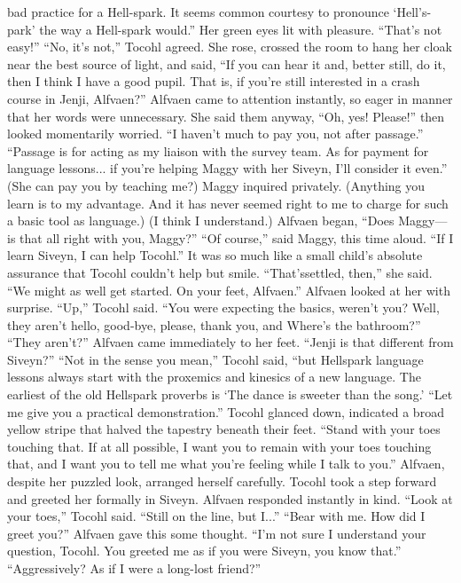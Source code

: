 \documentclass[9pt]{article}
\begin{document}
bad practice for a Hell-spark. It seems common courtesy to pronounce ‘Hell’s-park’ the way a
Hell-spark would.” Her green eyes lit with pleasure. “That’s not easy!”
“No, it’s not,” Tocohl agreed. She rose, crossed the room to hang her cloak near the best source of
light, and said, “If you can hear it and, better still, do it, then I think I have a good pupil. That is, if you’re
still interested in a crash course in Jenji, Alfvaen?”
Alfvaen came to attention instantly, so eager in manner that her words were unnecessary. She said
them anyway, “Oh, yes! Please!” then looked momentarily worried. “I haven’t much to pay you, not after
passage.”
“Passage is for acting as my liaison with the survey team. As for payment for language lessons... if
you’re helping Maggy with her Siveyn, I’ll consider it even.”
(She can pay you by teaching me?) Maggy inquired privately.
(Anything you learn is to my advantage. And it has never seemed right to me to charge for such a
basic tool as language.)
(I think I understand.)
Alfvaen began, “Does Maggy—is that all right with you, Maggy?”
“Of course,” said Maggy, this time aloud. “If I learn Siveyn, I can help Tocohl.”
It was so much like a small child’s absolute assurance that Tocohl couldn’t help but smile. “That’ssettled, then,” she said. “We might as well get started. On your feet, Alfvaen.”
Alfvaen looked at her with surprise.
“Up,” Tocohl said. “You were expecting the basics, weren’t you? Well, they aren’t hello, good-bye,
please, thank you, and Where’s the bathroom?”
“They aren’t?” Alfvaen came immediately to her feet. “Jenji is that different from Siveyn?”
“Not in the sense you mean,” Tocohl said, “but Hellspark language lessons always start with the
proxemics and kinesics of a new language. The earliest of the old Hellspark proverbs is ‘The dance is
sweeter than the song.’
“Let me give you a practical demonstration.” Tocohl glanced down, indicated a broad yellow stripe
that halved the tapestry beneath their feet. “Stand with your toes touching that. If at all possible, I want
you to remain with your toes touching that, and I want you to tell me what you’re feeling while I talk to
you.”
Alfvaen, despite her puzzled look, arranged herself carefully. Tocohl took a step forward and greeted
her formally in Siveyn. Alfvaen responded instantly in kind.
“Look at your toes,” Tocohl said.
“Still on the line, but I...”
“Bear with me. How did I greet you?”
Alfvaen gave this some thought. “I’m not sure I understand your question, Tocohl. You greeted me
as if you were Siveyn, you know that.”
“Aggressively? As if I were a long-lost friend?”
\end{document}
